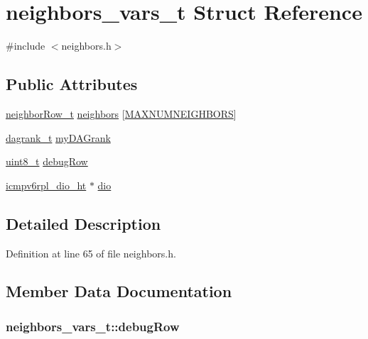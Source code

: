 \hypertarget{structneighbors__vars__t}{}\section{neighbors\+\_\+vars\+\_\+t Struct Reference}
\label{structneighbors__vars__t}


{\ttfamily \#include $<$neighbors.\+h$>$}

\subsection*{Public Attributes}
\begin{DoxyCompactItemize}
\item 
\hyperlink{structneighbor_row__t}{neighbor\+Row\+\_\+t} \hyperlink{structneighbors__vars__t_a0c28f8211f44d7a1ac87fb0f20832830}{neighbors} \mbox{[}\hyperlink{group___neighbors_gaf83606573bb704d34705b540c226a0d9}{M\+A\+X\+N\+U\+M\+N\+E\+I\+G\+H\+B\+O\+RS}\mbox{]}
\item 
\hyperlink{opendefs_8h_a502861d0bb432f5702761bd854023e21}{dagrank\+\_\+t} \hyperlink{structneighbors__vars__t_ad1da31e11ab0382ffbf1189e7803abcb}{my\+D\+A\+Grank}
\item 
\hyperlink{_p_e___types_8h_aba7bc1797add20fe3efdf37ced1182c5}{uint8\+\_\+t} \hyperlink{structneighbors__vars__t_a54be80f0acc1c14c93bd6006d0cec95b}{debug\+Row}
\item 
\hyperlink{structicmpv6rpl__dio__ht}{icmpv6rpl\+\_\+dio\+\_\+ht} $\ast$ \hyperlink{structneighbors__vars__t_a09c8cef2e547e5772a515f1eabcf6a50}{dio}
\end{DoxyCompactItemize}


\subsection{Detailed Description}


Definition at line 65 of file neighbors.\+h.



\subsection{Member Data Documentation}
\subsubsection[{\texorpdfstring{debug\+Row}{debugRow}}]{ neighbors\+\_\+vars\+\_\+t\+::debug\+Row}\hypertarget{structneighbors__vars__t_a54be80f0acc1c14c93bd6006d0cec95b}{}\label{structneighbors__vars__t_a54be80f0acc1c14c93bd6006d0cec95b}


